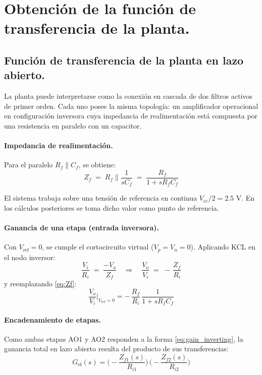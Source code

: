 \section{Obtención de la función de transferencia de la planta.}
\subsection{Función de transferencia de la planta en lazo abierto.}
La planta puede interpretarse como la conexión en cascada de dos filtros activos de primer orden. Cada uno posee la misma topología: un amplificador operacional en configuración inversora cuya impedancia de realimentación está compuesta por una resistencia en paralelo con un capacitor.

\paragraph{Impedancia de realimentación.}  
Para el paralelo $R_f \parallel C_f$, se obtiene:
\begin{equation}
	Z_f \;=\; R_f \parallel \frac{1}{sC_f}
	\;=\; \frac{R_f}{1 + s R_f C_f}
	\label{eq:Zf}
\end{equation}


El sistema trabaja sobre una tensión de referencia en continua $V_{\text{cc}}/2 = 2.5$ V. En los cálculos posteriores se toma dicho valor como punto de referencia.

\paragraph{Ganancia de una etapa (entrada inversora).}  
Con $V_{\text{ref}}=0$, se cumple el cortocircuito virtual ($V_p = V_n = 0$). Aplicando KCL en el nodo inversor:
\[
\frac{V_i}{R_i} \;=\; \frac{-V_o}{Z_f}
\quad\Rightarrow\quad
\frac{V_o}{V_i} \;=\; -\,\frac{Z_f}{R_i}
\]
y reemplazando \eqref{eq:Zf}:
\begin{equation}
	\frac{V_o}{V_i}\Bigg|_{V_{\text{ref}}=0}
	= -\,\frac{R_f}{R_i}\,\frac{1}{1+sR_f C_f}
	\label{eq:gain_inverting}
\end{equation}

\paragraph{Encadenamiento de etapas.}  
Como ambas etapas AO1 y AO2 responden a la forma \eqref{eq:gain_inverting}, la ganancia total en lazo abierto resulta del producto de sus transferencias:
\[
G_{\text{ol}}(s)
= \Big(-\frac{Z_{f1}(s)}{R_{i1}}\Big)\,
\Big(-\frac{Z_{f2}(s)}{R_{i2}}\Big)
\]


